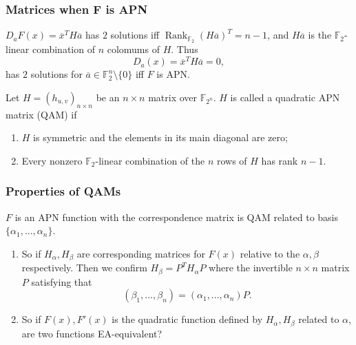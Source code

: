 \documentclass[
    aspectratio=169,                   %
]{beamer}
\newcommand{\F}{\mathbb{F}}
\begin{document}
    \begin{frame}
        \frametitle{Matrices when F is APN}
    
        $ D_aF(x)=\overline{x}^T H\overline{a} $ has $ 2 $ solutions 
        iff $ \operatorname{Rank}_{\F_2}(H\overline{a})^T =n-1 $, and $ H\overline{a} $ is 
        the $ \F_2 $-linear combination of $ n $  colomums of $ H $. Thus
        \[D_a(x)=\overline{x}^TH\overline{a}=0,\] 
        has $ 2 $ solutions for $ \overline{a}\in\F_2^n\setminus\{0\} $ iff $ F $ is APN. 
        \begin{definition}
            Let  $ H=(h_{u,v})_{n\times n} $ be an $ n\times n $ matrix over $ \F_{2^n} $. $ H $ is called a 
            quadratic APN matrix (QAM) if 
            \begin{enumerate}
                \item $H$ is symmetric and the elements in its main diagonal are zero;
                \item Every nonzero $ \F_2 $-linear combination of the $n$ rows of $H$ has rank $n − 1$.
            \end{enumerate}
        \end{definition} 
    
    \end{frame}

    \begin{frame}
        \frametitle{Properties of QAMs}
    
        $ F $ is an APN function with the correspondence matrix is QAM 
        related to basis $ \{\alpha_1,...,\alpha_n\} $.
        \begin{enumerate}
            \item So if $ H_{\alpha},H_{\beta} $ are corresponding matrices for $F(x)$ 
            relative to the $\alpha,\beta$ respectively. Then we confirm $ H_{\beta}=P^TH_{\alpha}P $ 
            where the invertible $ n\times n $ matrix $ P $ satisfying that  
            \[(\beta_1,...,\beta_n)=(\alpha_1,...,\alpha_n)P.\] 
            \item So if $ F(x),F'(x) $ is the quadratic function defined by $ H_{\alpha},H_{\beta} $ related to 
            $ \alpha $, are two functions EA-equivalent?
        \end{enumerate}

    \end{frame}
\end{document}

